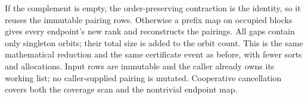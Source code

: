 If the complement is empty, the order-preserving contraction is the identity,
so it reuses the immutable pairing rows. Otherwise a prefix map on occupied
blocks gives every endpoint's new rank and reconstructs the pairings. All
gaps contain only singleton orbits; their total size is added to the orbit
count. This is the same mathematical reduction and the same certificate
event as before, with fewer sorts and allocations. Input rows are immutable
and the caller already owns its working list; no caller-supplied pairing
is mutated. Cooperative cancellation covers both the coverage scan and
the nontrivial endpoint map.


